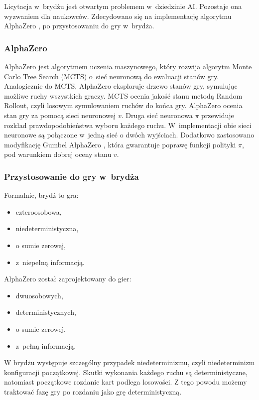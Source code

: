Licytacja w~brydżu jest otwartym problemem w~dziedzinie AI.
Pozostaje ona wyzwaniem dla naukowców.
Zdecydowano się na implementację algorytmu AlphaZero \cite{AlphaZeroPaper},
po przystosowaniu do gry w~brydża.

\subsubsection{AlphaZero}

AlphaZero jest algorytmem uczenia maszynowego, który rozwija
algorytm Monte Carlo Tree Search (MCTS) o~sieć neuronową do ewaluacji
stanów gry.
Analogicznie do MCTS, AlphaZero eksploruje drzewo stanów gry,
symulując możliwe ruchy wszystkich graczy.
MCTS ocenia jakość stanu metodą Random Rollout, czyli
losowym symulowaniem ruchów do końca gry.
AlphaZero ocenia stan gry za pomocą sieci neuronowej $v$.
Druga sieć neuronowa $\pi$ przewiduje rozkład
prawdopodobieństwa wyboru każdego ruchu.
W~implementacji obie sieci neuronowe są połączone w~jedną
sieć o dwóch wyjściach.
Dodatkowo zastosowano modyfikację
Gumbel AlphaZero \cite{GumbelAZ},
która gwarantuje poprawę funkcji polityki $\pi$, pod warunkiem
dobrej oceny stanu $v$.


\subsubsection{Przystosowanie do gry w~brydża}

Formalnie, brydż to gra:
\begin{itemize}
  \item czteroosobowa,
  \item niedeterministyczna,
  \item o sumie zerowej,
  \item z~niepełną informacją.
\end{itemize}

AlphaZero został zaprojektowany do gier:
\begin{itemize}
  \item dwuosobowych,
  \item deterministycznych,
  \item o sumie zerowej,
  \item z~pełną informacją.
\end{itemize}

W brydżu występuje szczególny przypadek niedeterminizmu,
czyli niedeterminizm konfiguracji początkowej.
Skutki wykonania każdego ruchu są deterministyczne,
natomiast początkowe rozdanie kart podlega losowości.
Z tego powodu możemy traktować fazę gry po rozdaniu jako
grę deterministyczną.


